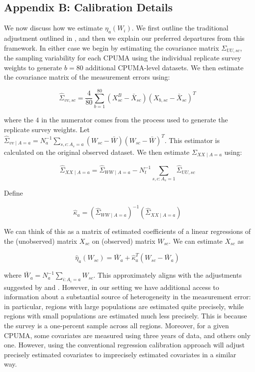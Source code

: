 \documentclass[12pt]{article}
\begin{document}
\subsection{Appendix B: Calibration Details}

We now discuss how we estimate $\eta_a(W_i)$. We first outline the traditional adjustment outlined in \cite{carroll2006measurement}, and then we explain our preferred departures from this framework. In either case we begin by estimating the covariance matrix $\Sigma_{UU, sc}$, the sampling variability for each CPUMA using the individual replicate survey weights to generate $b = 80$ additional CPUMA-level datasets. We then estimate the covariance matrix of the measurement errors using:

$$
\hat{\Sigma}_{vv, sc} = \frac{4}{80}\sum_{b=1}^{80}(X_{sc}^B - \bar{X}_{sc})(X_{b, sc} - \bar{X}_{sc})^T
$$

where the $4$ in the numerator comes from the process used to generate the replicate survey weights. Let $\hat{\Sigma}_{vv \mid A = a} = N_a^{-1}\sum_{s, c: A_s = a} (W_{sc} - \bar{W})(W_{sc} - \bar{W})^T$. This estimator is calculated on the original observed dataset. We then estimate $\Sigma_{XX \mid A = a}$ using:

$$
\hat{\Sigma}_{XX \mid A = a} = \hat{\Sigma}_{WW \mid A = a} - N_t^{-1}\sum_{s, c: A_s = 1} \hat{\Sigma}_{UU, sc}
$$

Define

$$
\hat{\kappa}_a = (\hat{\Sigma}_{WW \mid A = a})^{-1}(\hat{\Sigma}_{XX \mid A = a})
$$

We can think of this as a matrix of estimated coefficients of a linear regressions of the (unobserved) matrix $X_{sc}$ on (observed) matrix $W_{sc}$. We can estimate $X_{sc}$ as

$$
\hat{\eta}_a(W_{sc}) = \bar{W}_a + \hat{\kappa}_a^T(W_{sc} - \bar{W}_a)
$$

where $\bar{W}_a = N_a^{-1}\sum_{i: A_i = a} W_{sc}$. This approximately aligns with the adjustments suggested by \cite{carroll2006measurement} and \cite{gleser1992importance}. However, in our setting we have additional access to information about a substantial source of heterogeneity in the measurement error: in particular, regions with large populations are estimated quite precisely, while regions with small populations are estimated much less precisely. This is because the survey is a one-percent sample across all regions. Moreover, for a given CPUMA, some covariates are measured using three years of data, and others only one. However, using the conventional regression calibration approach will adjust precisely estimated covariates to imprecisely estimated covariates in a similar way. 
\end{document}
